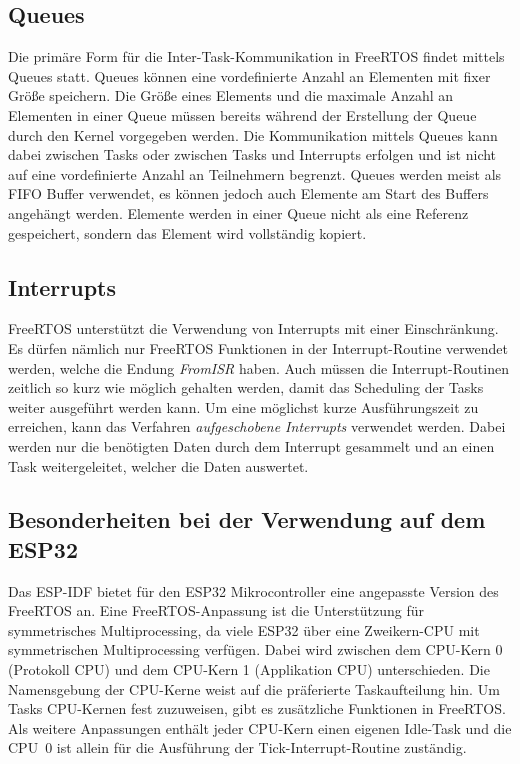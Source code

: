 \subsection{Queues}
Die primäre Form für die Inter-Task-Kommunikation in FreeRTOS findet mittels Queues statt. Queues können eine vordefinierte Anzahl an Elementen mit fixer Größe speichern. Die Größe eines Elements und die maximale Anzahl an Elementen in einer Queue müssen bereits während der Erstellung der Queue durch den Kernel vorgegeben werden. Die Kommunikation mittels Queues kann dabei zwischen Tasks oder zwischen Tasks und Interrupts erfolgen und ist nicht auf eine vordefinierte Anzahl an Teilnehmern begrenzt. Queues werden meist als \ac{FIFO} Buffer verwendet, es können jedoch auch Elemente am Start des Buffers angehängt werden. Elemente werden in einer Queue nicht als eine Referenz gespeichert, sondern das Element wird vollständig kopiert. \cites[S.~104ff.]{barryFreeRTOS}{freeRTOSQueues}

\subsection{Interrupts}
FreeRTOS unterstützt die Verwendung von Interrupts mit einer Einschränkung. Es dürfen nämlich nur FreeRTOS Funktionen in der Interrupt-Routine verwendet werden, welche die Endung \textit{FromISR} haben. Auch müssen die Interrupt-Routinen zeitlich so kurz wie möglich gehalten werden, damit das Scheduling der Tasks weiter ausgeführt werden kann. Um eine möglichst kurze Ausführungszeit zu erreichen, kann das Verfahren \textit{aufgeschobene Interrupts} verwendet werden. Dabei werden nur die benötigten Daten durch dem Interrupt gesammelt und an einen Task weitergeleitet, welcher die Daten auswertet. \cites[S.~185]{barryFreeRTOS}[S.~195]{barryFreeRTOS}

\subsection{Besonderheiten bei der Verwendung auf dem ESP32}
Das \ac{ESP-IDF} bietet für den ESP32 Mikrocontroller eine angepasste Version des FreeRTOS an. Eine FreeRTOS-Anpassung ist die Unterstützung für symmetrisches Multiprocessing, da viele ESP32 über eine Zweikern-\acs{CPU} mit symmetrischen Multiprocessing verfügen. Dabei wird zwischen dem \acs{CPU}-Kern 0 (Protokoll \acs{CPU}) und dem \acs{CPU}-Kern 1 (Applikation \acs{CPU}) unterschieden. Die Namensgebung der \acs{CPU}-Kerne weist auf die präferierte Taskaufteilung hin. Um Tasks \acs{CPU}-Kernen fest zuzuweisen, gibt es zusätzliche Funktionen in FreeRTOS. Als weitere Anpassungen enthält jeder {CPU}-Kern einen eigenen Idle-Task und die \acs{CPU}~0 ist allein für die Ausführung der Tick-Interrupt-Routine zuständig. \cites{espressifSMP}{espressifFreeRTOS}

